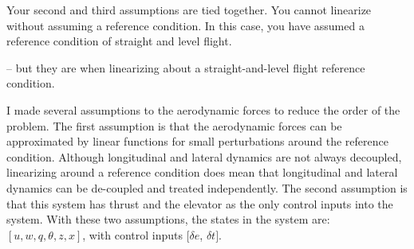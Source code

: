 Your second and third assumptions are tied together.  You cannot linearize without assuming a reference condition.  In this case, you have assumed a reference condition of straight and level flight.

 -- but they
are when linearizing about a straight-and-level flight reference
condition.

I made several assumptions to the aerodynamic forces to reduce the
order of the problem. The first assumption is that
the aerodynamic forces can be approximated by linear functions for
small perturbations around the reference condition. Although
longitudinal and lateral dynamics are not always decoupled,
linearizing around a reference condition does mean that longitudinal and lateral dynamics
can be de-coupled and treated independently. The second assumption is that this
system has thrust and the elevator as the only control inputs
into the system. With these two assumptions, the states in the system
are: $[u, w, q, \theta, z, x]$, with control inputs $[\delta e$,
  $\delta t]$.

